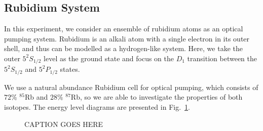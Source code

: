 \subsection{Rubidium System}

In this experiment, we consider an ensemble of rubidium atoms as an
optical pumping system. Rubidium is an alkali atom with a single
electron in its outer shell, and thus can be modelled as a
hydrogen-like system. Here, we take the outer $5^2S_{1/2}$ level as
the ground state and focus on the $D_1$ transition between the
$5^2S_{1/2}$ and $5^2P_{1/2}$ states. 

We use a natural abundance Rubidium cell for optical pumping, which
consists of $72\%$ $^{85}$Rb and $28\%$ $^{87}$Rb, so we are able to
investigate the properties of both isotopes. The energy level diagrams
are presented in Fig.~\ref{fig:8587levels}.


\begin{figure}[h]
\begin{center}
\hspace{-1mm}
\vspace{-2mm}
\vspace{-2mm}
\caption{\small{CAPTION GOES HERE}}
\label{fig:8587levels}
\end{center}
\end{figure}

